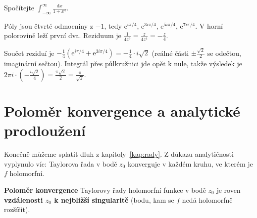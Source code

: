 \begin{problem}
  Spočítejte $\int_{-\infty}^{\infty}\frac{\mathrm{d}x}{1 + x^4}$.
\end{problem}

\begin{hint}
  Póly jsou čtvrté odmocniny z $-1$, tedy $\mathrm{e}^{i\pi/4}$, $\mathrm{e}^{3i\pi/4}$, $\mathrm{e}^{5i\pi/4}$, $\mathrm{e}^{7i\pi/4}$. V horní polorovině leží první dva. Reziduum je $\frac{1}{4z^3} = \frac{z}{4z^4} = -\frac{z}{4}$.
\end{hint}

\begin{solution}
  Součet reziduí je $-\frac{1}{4}\left(\mathrm{e}^{i\pi/4} + \mathrm{e}^{3i\pi/4}\right) = -\frac{1}{4}\cdot i\sqrt{2}$ (reálné části $\pm\frac{\sqrt{2}}{2}$ se odečtou, imaginární sečtou). Integrál přes půlkružnici jde opět k nule, takže výsledek je $2\pi i\cdot\left(-\frac{i\sqrt{2}}{4}\right) = \frac{\pi\sqrt{2}}{2} = \frac{\pi}{\sqrt{2}}$.
\end{solution}

\section{Poloměr konvergence a analytické prodloužení}

Konečně můžeme splatit dluh z kapitoly~\ref{kap:rady}. Z důkazu analytičnosti vyplynulo víc: Taylorova řada v bodě $z_0$ konverguje v každém kruhu, ve kterém je $f$ holomorfní.

\begin{definitionbox}
  \textbf{Poloměr konvergence} Taylorovy řady holomorfní funkce v bodě $z_0$ je roven \textbf{vzdálenosti $z_0$ k nejbližší singularitě} (bodu, kam se $f$ nedá holomorfně rozšířit).
\end{definitionbox}

\begin{center}
\end{center}

